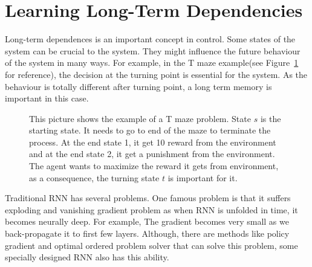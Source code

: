 \documentclass[officiallayout]{tktla}
\begin{document}
\section{Learning Long-Term Dependencies}

Long-term dependences is an important concept in control. Some states of the system can be crucial to the system. They might influence the future behaviour of the system in many ways. For example, in the T maze example(see Figure~\ref{tmaze} for reference), the decision at the turning  point is essential for the system. As the behaviour is totally different after turning point, a long term memory is important in this case.
\begin{figure}[h!]
\centering
{}

\caption{This picture shows the example of a T maze problem. State $s$ is the starting state. It needs to go to end of the maze to terminate the process. At the end state 1, it get 10 reward from the environment and at the end state 2, it get a punishment from the environment. The agent wants to maximize the reward it gets from environment, as a consequence, the turning state $t$ is important for it.}\label{tmaze}
\end{figure}


Traditional RNN has several problems. One famous problem is that it suffers exploding and vanishing gradient problem as when RNN is unfolded in time, it becomes neurally deep. For example, The gradient becomes very small as we back-propagate it to first few layers. Although, there are methods like policy gradient and optimal ordered problem solver that can solve this problem, some specially designed RNN also has this ability.
\end{document}
